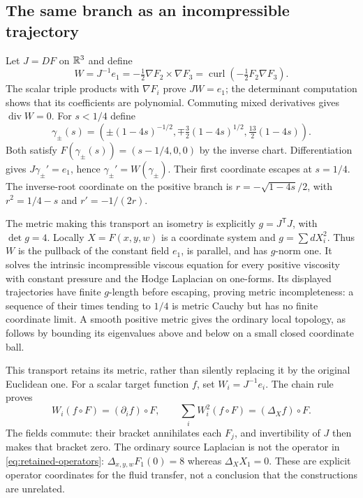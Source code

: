 \subsection{The same branch as an incompressible trajectory}
Let $J=DF$ on $\mathbb R^3$ and define
\begin{equation}
 W=J^{-1}e_1=-\tfrac12\nabla F_2\times\nabla F_3
   =\operatorname{curl}(-\tfrac12F_2\nabla F_3).
 \label{eq:retained-piola}
\end{equation}
The scalar triple products with $\nabla F_i$ prove $JW=e_1$;
the determinant computation shows that its coefficients are
polynomial. Commuting mixed derivatives gives
$\operatorname{div}W=0$.
For $s<1/4$ define
\[
 \gamma_\pm(s)=\left(\pm(1-4s)^{-1/2},
       \mp\tfrac32(1-4s)^{1/2},\tfrac{13}2(1-4s)\right).
\]
Both satisfy $F(\gamma_\pm(s))=(s-1/4,0,0)$ by the inverse chart.
Differentiation gives $J\gamma_\pm'=e_1$, hence
$\gamma_\pm'=W(\gamma_\pm)$. Their first coordinate escapes at
$s=1/4$. The inverse-root coordinate on the positive branch is
$r=-\sqrt{1-4s}/2$, with $r^2=1/4-s$ and $r'=-1/(2r)$.

The metric making this transport an isometry is explicitly
$g=J^{\mathsf T}J$, with $\det g=4$.
Locally $X=F(x,y,w)$ is a coordinate system and $g=\sum dX_i^2$.
Thus $W$ is the pullback of the constant field $e_1$, is parallel,
and has $g$-norm one. It solves the intrinsic incompressible viscous
equation for every positive viscosity with constant pressure and the
Hodge Laplacian on one-forms. Its displayed trajectories have finite
$g$-length before escaping, proving metric incompleteness: a sequence
of their times tending to $1/4$ is metric Cauchy but has no finite
coordinate limit. A smooth positive metric gives the ordinary local
topology, as follows by bounding its eigenvalues above and below on
a small closed coordinate ball.

This transport retains its metric, rather than silently replacing it
by the original Euclidean one. For a scalar target function $f$, set
$W_i=J^{-1}e_i$. The chain rule proves
\begin{equation}
 W_i(f\circ F)=(\partial_i f)\circ F,
 \qquad \sum_iW_i^2(f\circ F)=(\Delta_Xf)\circ F.
 \label{eq:retained-operators}
\end{equation}
The fields commute: their bracket annihilates each $F_j$, and
invertibility of $J$ then makes that bracket zero.
The ordinary source Laplacian is not the operator in
\eqref{eq:retained-operators}: $\Delta_{x,y,w}F_1(0)=8$ whereas
$\Delta_X X_1=0$. These are explicit operator coordinates for the
fluid transfer, not a conclusion that the constructions are unrelated.

